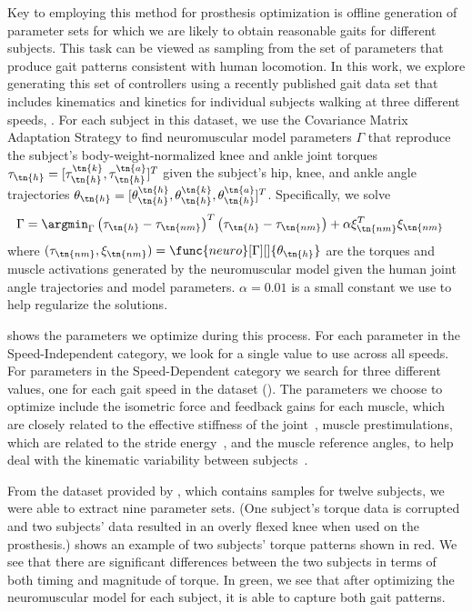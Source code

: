 Key to employing this method for prosthesis optimization is offline generation
of parameter sets for which we are likely to obtain reasonable gaits for
different subjects. This task can be viewed as sampling from the set of
parameters that produce gait patterns consistent with human locomotion. In this
work, we explore generating this set of controllers using a recently published
gait data set that includes kinematics and kinetics for individual subjects
walking at three different speeds, 
\citep{moore2015elaborate}.  For each subject in this dataset, we use the
Covariance Matrix Adaptation Strategy \citep{hansen2006cma} to find
neuromuscular model parameters $\Gamma$ that reproduce the subject's
body-weight-normalized knee and ankle joint torques $\tau_\tn{h} =
[\tau_\tn{h}^\tn{k},\tau_\tn{h}^\tn{a}]^T$ given the subject's hip, knee, and
ankle angle trajectories $\theta_\tn{h} =
[\theta_\tn{h}^\tn{h},\theta_\tn{h}^\tn{k},\theta_\tn{h}^\tn{a}]^T$.
Specifically, we solve
\begin{align}
    \Gamma &= \argmin_\Gamma \left(\tau_\tn{h} - \tau_\tn{nm} \right)^T
    \left(\tau_\tn{h} - \tau_\tn{nm} \right) + \alpha \xi_\tn{nm}^T \xi_\tn{nm}
\end{align}
where $(\tau_\tn{nm}, \xi_\tn{nm}) = \func{neuro}[\Gamma][]{\theta_\tn{h}}$ are
the torques and muscle activations generated by the neuromuscular model given
the human joint angle trajectories and model parameters. $\alpha = 0.01$ is a
small constant we use to help regularize the solutions.

 shows the parameters we optimize during this process.  For
each parameter in the Speed-Independent category, we look for a single value to
use across all speeds. For parameters in the Speed-Dependent category we search
for three different values, one for each gait speed in the dataset
(). The parameters we choose to optimize
include the isometric force and feedback gains for each muscle, which are
closely related to the effective stiffness of the
joint~\citep{geyer2003positive}, muscle prestimulations, which are related to
the stride energy~\citep{geyer2003positive}, and the muscle reference angles, to
help deal with the kinematic variability between
subjects~\citep{geyer2010muscle}.

From the dataset provided by \citet{moore2015elaborate}, which contains samples
for twelve subjects, we were able to extract nine parameter sets. (One subject's
torque data is corrupted and two subjects' data resulted in an overly flexed
knee when used on the prosthesis.)  shows an example of two
subjects' torque patterns shown in red. We see that there are significant
differences between the two subjects in terms of both timing and magnitude of
torque. In green, we see that after optimizing the neuromuscular model for each
subject, it is able to capture both gait patterns. 

